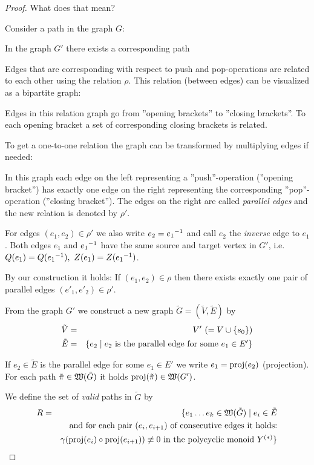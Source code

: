 \begin{proof}
What does that mean?

Consider a path in the graph $G$:

\missingfigure

In the graph $G'$ there exists a corresponding path

\missingfigure

Edges that are corresponding with respect to push and pop-operations are related
to each other using the relation $\rho$. This relation (between edges) can be
visualized as a bipartite graph:

\missingfigure

Edges in this relation graph go from ''opening brackets'' to ''closing
brackets''. To each opening bracket a set of corresponding closing brackets is
related. 

To get a one-to-one relation the graph can be transformed by multiplying edges
if needed:

\missingfigure

In this graph each edge on the left representing a ''push''-operation
(''opening bracket'') has exactly one edge on the right representing the
corresponding ''pop''-operation (''closing bracket''). The edges on the right
are called {\em parallel edges} and the new relation is denoted by $\rho'$.

For edges $(e_1, e_2) \in \rho'$ we also write $e_2 = \mbox{${e_1}^{-1}$}$ and call $e_2$
the {\em inverse} edge to $e_1$. Both edges $e_1$ and $\mbox{${e_1}^{-1}$}$ have the same
source and target vertex in $G'$, i.e.\ $Q(e_1) = Q(\mbox{${e_1}^{-1}$}),\ Z(e_1) =
Z(\mbox{${e_1}^{-1}$})$.

By our construction it holds: If $(e_1, e_2) \in \rho$ then there exists exactly
one pair of parallel edges $(e'_1, e'_2)  \in \rho'$.

From the graph $G'$ we construct a new graph $\tilde{G} = (\tilde{V},
\tilde{E})$ by
\begin{eqnarray*}
\tilde{V} &=& V' \ (=V \cup \mbox{$\{s_0\}$}) \\
\tilde{E} &=& \mbox{$\{e_2 \mid e_2\text{ is the parallel edge for some $e_1 \in
E'$}\}$}
\end{eqnarray*}

If $e_2 \in \tilde{E}$ is the parallel edge for some $e_1 \in E'$ we write $e_1
= \mathrm{proj}({e_2})$ (projection). For each path $\tilde{\pi} \in \mbox{$\mathfrak{W}({\tilde{G}})$}$ it
holds $\mathrm{proj}({\tilde{\pi}}) \in \mbox{$\mathfrak{W}({G'})$}$.

We define the set of {\em valid} paths in $\tilde{G}$ by
\begin{eqnarray*}
R &=& \{ e_1 \ldots e_k \in \mbox{$\mathfrak{W}({\tilde{G}})$} \mid e_i \in \tilde{E} \\
& & \text{and for each pair }(e_i, e_{i+1})\text{ of consecutive edges it
holds:}\\
& & \gamma(\mathrm{proj}({e_i}) \circ \mathrm{proj}({e_{i+1}})) \not\equiv 0\text{ in the
polycyclic monoid }\mbox{${Y}^{(*)}$} \}
\end{eqnarray*} 


\end{proof}
